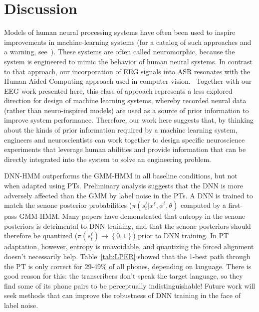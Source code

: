 \section{Discussion}

Models of human neural processing systems have often been used to
inspire improvements in machine-learning systems (for a catalog 
of such approaches and a warning, see~\cite{Bourlard96}).  These
systems are often called neuromorphic, because the system is engineered
to mimic the behavior of human neural systems. In contrast to that
approach, our incorporation of EEG signals into ASR resonates with
the Human Aided Computing approach used in computer
vision.~\cite{Shenoy08,Wang09} Together with our EEG work presented here,
this class of approach represents a less explored direction for design
of machine learning systems, whereby recorded neural data (rather than
neuro-inspired models) are used as a source of prior information to
improve system performance. Therefore, our work here suggests that, by
thinking about the kinds of prior information required by a machine
learning system, engineers and neuroscientists can work together to
design specific neuroscience experiments that leverage human abilities
and provide information that can be directly integrated into the system
to solve an engineering problem.

DNN-HMM outperforms the GMM-HMM in all baseline conditions, but not
when adapted using PTs.  Preliminary analysis suggests that the DNN is
more adversely affected than the GMM by label noise in the PTs.  A DNN
is trained to match the senone posterior probabilities
($\pi(s_t^\ell|x^\ell,\phi^\ell,\theta)$ computed by a first-pass
GMM-HMM.  Many papers have demonstrated that entropy in the senone
posteriors is detrimental to DNN training, and that the senone
posteriors should therefore be quantized
($\pi(s_t^\ell)\rightarrow\left\{0,1\right\}$) prior to DNN training.
In PT adaptation, however, entropy is unavoidable, and quantizing the
forced alignment doesn't necessarily help.  Table~\ref{tab:LPER}
showed that the 1-best path through the PT is only correct for 29-49\%
of all phones, depending on language.  There is good reason for this:
the transcribers don't speak the target language, so they find some of
its phone pairs to be perceptually indistinguishable!  Future work
will seek methods that can improve the robustness of DNN training in
the face of label noise.  

